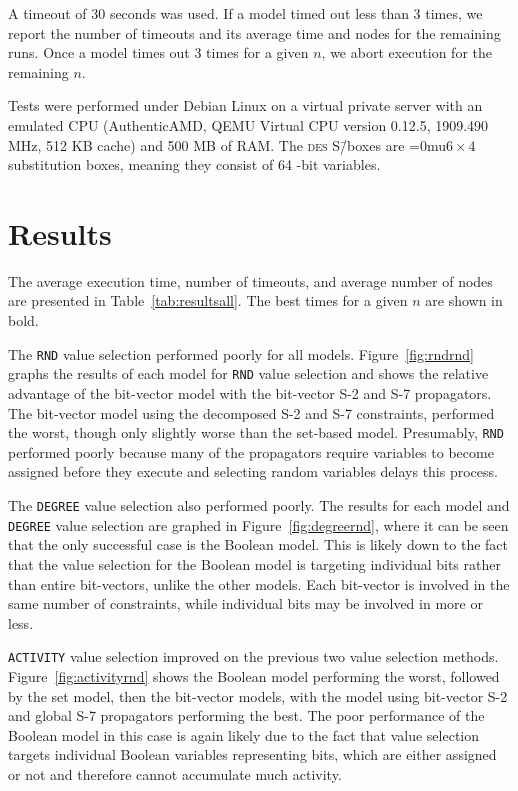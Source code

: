 \documentclass[a4paper,10pt,twoside,openright]{book}
\renewcommand{\sc}[1]{\textsc{\lowercase{#1}}}
\renewcommand{\ln}[1]{{\fontsize{8pt}{8pt}\selectfont#1}}
\newcommand*\cd[1]{\texttt{#1}}
\newcommand*\sixbyfour{\begingroup\medmuskip=0mu\relax$6 \times 4$\endgroup}
\begin{document}
A timeout of $30$ seconds was used. 
If a model timed out less than 3 times, we report the number of timeouts and its average time and nodes for the remaining runs. 
Once a model times out 3 times for a given $n$, we abort execution for the remaining $n$.

Tests were performed under Debian Linux on a virtual private server with an emulated CPU (AuthenticAMD, QEMU Virtual CPU version 0.12.5, 1909.490 MHz, 512 KB cache) and 500 MB of RAM. The \sc{DES} S\=/boxes are \sixbyfour{} substitution boxes, meaning they consist of 64 \ln{4}-bit variables.
\newpage
\begin{table}[H]
    \centering
    \sffamily
    \robustify\bfseries%
    \setlength{\tabcolsep}{4pt}
    \small
    
\end{table}
\newpage

\section{Results}
The average execution time, number of timeouts, and average number of nodes are presented
in Table~\ref{tab:resultsall}. The best times for a given $n$ are shown in bold.

The \cd{RND} value selection performed poorly for all models.
Figure~\ref{fig:rndrnd} graphs the results of each model for \cd{RND} value selection
and shows the relative advantage of the bit-vector model with 
the bit-vector S-2 and S-7 propagators.
The bit-vector model using the decomposed S-2 and S-7 constraints, 
performed the worst, though only slightly worse than
the set-based model.
Presumably, \cd{RND} performed poorly because many of the propagators require 
variables to become assigned before they execute and selecting random variables
delays this process.

The \cd{DEGREE} value selection also performed poorly.
The results for each model and \cd{DEGREE} value selection are
graphed in Figure~\ref{fig:degreernd}, 
where it can be seen that the only 
successful case is the Boolean model. 
This is likely down to the fact that the value selection for the Boolean model
is targeting individual bits rather than entire bit-vectors, unlike the other models. 
Each bit-vector is involved in the same number of constraints, while individual bits may be involved in more or less.

\cd{ACTIVITY} value selection improved on the previous two value selection methods.
Figure~\ref{fig:activityrnd} shows 
the Boolean model performing the worst,
followed by the set model,
then the bit-vector models, with the model using bit-vector S-2 and global S-7 propagators performing the best.
The poor performance of the Boolean model in this case is again likely due to the fact that value selection
targets individual Boolean variables representing bits, which are either assigned or not and therefore
cannot accumulate much activity.
\end{document}
